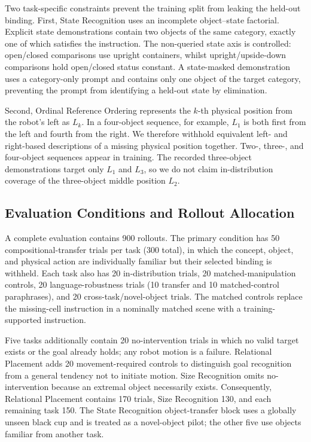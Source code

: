 \documentclass[conference]{IEEEtran}
\begin{document}
Two task-specific constraints prevent the training split from leaking the held-out binding. First, State Recognition uses an incomplete object--state factorial. Explicit state demonstrations contain two objects of the same category, exactly one of which satisfies the instruction. The non-queried state axis is controlled: open/closed comparisons use upright containers, whilst upright/upside-down comparisons hold open/closed status constant. A state-masked demonstration uses a category-only prompt and contains only one object of the target category, preventing the prompt from identifying a held-out state by elimination.

Second, Ordinal Reference Ordering represents the $k$-th physical position from the robot's left as $L_k$. In a four-object sequence, for example, $L_1$ is both first from the left and fourth from the right. We therefore withhold equivalent left- and right-based descriptions of a missing physical position together. Two-, three-, and four-object sequences appear in training. The recorded three-object demonstrations target only $L_1$ and $L_3$, so we do not claim in-distribution coverage of the three-object middle position $L_2$.

\subsection{Evaluation Conditions and Rollout Allocation}

A complete evaluation contains 900 rollouts. The primary condition has 50
compositional-transfer trials per task (300 total), in which the concept,
object, and physical action are individually familiar but their selected
binding is withheld. Each task also has 20 in-distribution trials, 20
matched-manipulation controls, 20 language-robustness trials (10 transfer
and 10 matched-control paraphrases), and 20 cross-task/novel-object trials.
The matched controls replace the missing-cell instruction in a nominally
matched scene with a training-supported instruction.

Five tasks additionally contain 20 no-intervention trials in which no valid
target exists or the goal already holds; any robot motion is a failure.
Relational Placement adds 20 movement-required controls to distinguish
goal recognition from a general tendency not to initiate motion. Size
Recognition omits no-intervention because an extremal object necessarily
exists. Consequently, Relational Placement contains 170 trials, Size
Recognition 130, and each remaining task 150. The State Recognition
object-transfer block uses a globally unseen black cup and is treated as a
novel-object pilot; the other five use objects familiar from another task.
\end{document}
